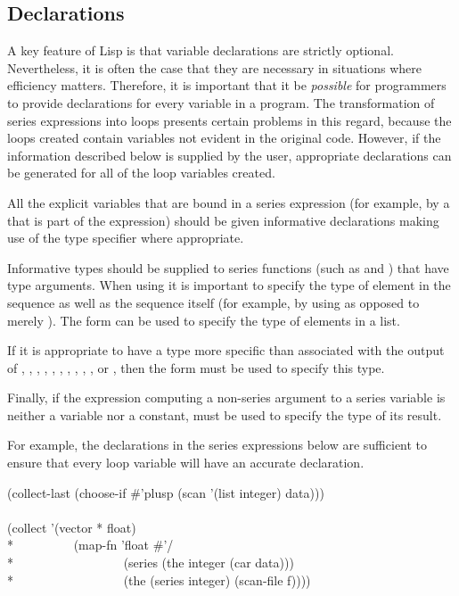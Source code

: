 \subsection{Declarations}

A key feature of Lisp is that variable declarations are strictly optional.
Nevertheless, it is often the case that they are necessary in situations
where efficiency matters.  Therefore, it is important that it be {\it
possible} for programmers to provide declarations for every variable in a
program.  The transformation of series expressions into loops presents
certain problems in this regard, because the loops created contain
variables not evident in the original code.  However, if the information
described below is supplied by the user, appropriate declarations can be
generated for all of the loop variables created.

All the explicit variables that are bound in a series expression (for example, by a 
 that is part of the expression) should be given informative
declarations making use of the type specifier 
where appropriate.

Informative types should be supplied to series functions (such as 
 and ) that have type arguments.  When using 
 it is important to specify the type of element in the sequence as
well as the sequence itself (for example, by using  as
opposed to merely ).  The form 
can be used to specify the type of elements in a list.

If it is appropriate to have a type more specific than 
associated with the output of , , , 
, , , 
, ,
, , or , then the form
 must be used to specify this type.

Finally, if the expression computing a non-series argument to a series
variable is neither a variable nor a constant,  must be used to
specify the type of its result.

For example, the declarations in the series expressions below are
sufficient to ensure that every loop variable will have an accurate
declaration.
\begin{lisp}
(collect-last (choose-if \#'plusp (scan '(list integer) data))) \\
\\
(collect '(vector * float) \\*
~~~~~~~~~(map-fn 'float \#'/ \\*
~~~~~~~~~~~~~~~~~(series (the integer (car data))) \\*
~~~~~~~~~~~~~~~~~(the (series integer) (scan-file f))))
\end{lisp}


